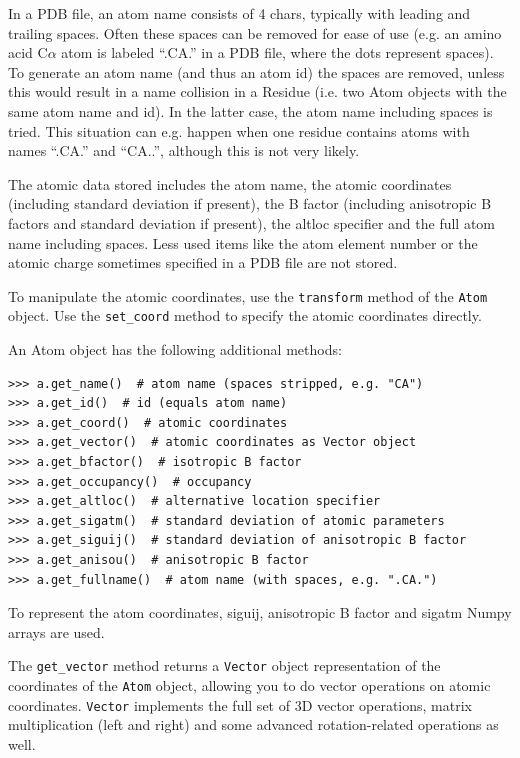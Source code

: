 In a PDB file, an atom name consists of 4 chars, typically with leading and
trailing spaces. Often these spaces can be removed for ease of use (e.g. an
amino acid C\( \alpha  \) atom is labeled ``.CA.'' in a PDB file, where
the dots represent spaces). To generate an atom name (and thus an atom id) the
spaces are removed, unless this would result in a name collision in a Residue
(i.e. two Atom objects with the same atom name and id). In the latter case,
the atom name including spaces is tried. This situation can e.g. happen when
one residue contains atoms with names ``.CA.'' and ``CA..'', although
this is not very likely.

The atomic data stored includes the atom name, the atomic coordinates (including
standard deviation if present), the B factor (including anisotropic B factors
and standard deviation if present), the altloc specifier and the full atom name
including spaces. Less used items like the atom element number or the atomic
charge sometimes specified in a PDB file are not stored.

To manipulate the atomic coordinates, use the \texttt{transform} method of
the \texttt{Atom} object. Use the \texttt{set\_coord} method to specify the
atomic coordinates directly.

An Atom object has the following additional methods:

\begin{verbatim}
>>> a.get_name()  # atom name (spaces stripped, e.g. "CA")
>>> a.get_id()  # id (equals atom name)
>>> a.get_coord()  # atomic coordinates
>>> a.get_vector()  # atomic coordinates as Vector object
>>> a.get_bfactor()  # isotropic B factor
>>> a.get_occupancy()  # occupancy
>>> a.get_altloc()  # alternative location specifier
>>> a.get_sigatm()  # standard deviation of atomic parameters
>>> a.get_siguij()  # standard deviation of anisotropic B factor
>>> a.get_anisou()  # anisotropic B factor
>>> a.get_fullname()  # atom name (with spaces, e.g. ".CA.")
\end{verbatim}

To represent the atom coordinates, siguij, anisotropic B factor and sigatm Numpy
arrays are used.

The \texttt{get\_vector} method returns a \texttt{Vector} object representation of the coordinates of the \texttt{Atom} object, allowing you to do vector operations on atomic coordinates. \texttt{Vector} implements the full set of 3D vector operations, matrix multiplication (left and right) and some advanced rotation-related operations as well.

